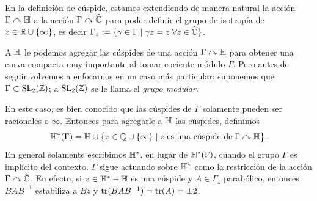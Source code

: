 \begin{notas}
  En la definici\'on de c\'uspide, estamos extendiendo de manera natural la acci\'on $\Gamma\curvearrowright\mathbb{H}$
  a la acci\'on $\Gamma\act\what{\CC}$  para poder definir el grupo de isotrop\'ia de
  $z\in\mathbb{R}\cup\{\infty\}$, es decir
  $\Gamma_z:=\{\gamma\in\Gamma\mid \gamma z=z\;\forall z\in\what{\CC}\}$.
  
\end{notas}

A $\mathbb{H}$ le podemos agregar las c\'uspides de una acci\'on $\Gamma\curvearrowright\mathbb{H}$ para obtener una curva
compacta muy importante al tomar cociente m\'odulo $\Gamma$. Pero antes de seguir volvemos a
enfocarnos en un caso m\'as particular: suponemos que $\Gamma\subset\mathrm{SL}_2(\mathbb{Z})$; a $\mathrm{SL}_2(\mathbb{Z})$ se
le llama el \emph{grupo modular}.


En este caso, es bien conocido que las c\'uspides de $\Gamma$ solamente pueden ser racionales o
$\infty$. Entonces para agregarle a $\mathbb{H}$ las c\'uspides, definimos
\[
  \mathbb{H}^*(\Gamma)=
  \mathbb{H}\cup\big\{z\in\mathbb{Q}\cup\{\infty\}\mid z\;\text{es una c\'uspide de}\;\Gamma\curvearrowright\mathbb{H}\big\}.
\]
En general solamente escribimos $\mathbb{H}^*$, en lugar de $\mathbb{H}^*(\Gamma)$, cuando el grupo $\Gamma$ es
impl\'icito del contexto. $\Gamma$ sigue actuando sobre $\mathbb{H}^*$ como la restricci\'on de la acci\'on
$\Gamma\curvearrowright\hat{\mathbb{C}}$. En efecto, si $z\in\mathbb{H}^*-\mathbb{H}$ es una c\'uspide y $A\in\Gamma_z$ parab\'olico,
entonces $BAB^{-1}$ estabiliza a $Bz$ y $\mathrm{tr}(BAB^{-1})=\mathrm{tr}(A)=\pm2$.

